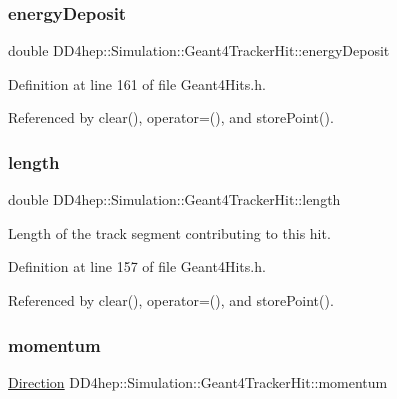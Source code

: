\subsubsection{\texorpdfstring{energy\+Deposit}{energyDeposit}}
{\footnotesize\ttfamily double D\+D4hep\+::\+Simulation\+::\+Geant4\+Tracker\+Hit\+::energy\+Deposit}



Definition at line 161 of file Geant4\+Hits.\+h.



Referenced by clear(), operator=(), and store\+Point().

\hypertarget{class_d_d4hep_1_1_simulation_1_1_geant4_tracker_hit_a71b52bb59bc3f9a54d50c925f92027a5}{}\label{class_d_d4hep_1_1_simulation_1_1_geant4_tracker_hit_a71b52bb59bc3f9a54d50c925f92027a5} 
\subsubsection{\texorpdfstring{length}{length}}
{\footnotesize\ttfamily double D\+D4hep\+::\+Simulation\+::\+Geant4\+Tracker\+Hit\+::length}



Length of the track segment contributing to this hit. 



Definition at line 157 of file Geant4\+Hits.\+h.



Referenced by clear(), operator=(), and store\+Point().

\hypertarget{class_d_d4hep_1_1_simulation_1_1_geant4_tracker_hit_a134e45be8162d17fc85e1a0c5f8b7e52}{}\label{class_d_d4hep_1_1_simulation_1_1_geant4_tracker_hit_a134e45be8162d17fc85e1a0c5f8b7e52} 
\subsubsection{\texorpdfstring{momentum}{momentum}}
{\footnotesize\ttfamily \hyperlink{namespace_d_d4hep_1_1_geometry_a56730a0ddb9f3f089c415cd693bd7c19}{Direction} D\+D4hep\+::\+Simulation\+::\+Geant4\+Tracker\+Hit\+::momentum}



